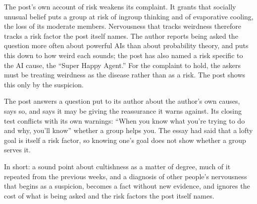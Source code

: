 \begin{afterword}
The post's own account of risk weakens its complaint. It grants that socially unusual belief puts a group at risk of ingroup thinking and of evaporative cooling, the loss of its moderate members. Nervousness that tracks weirdness therefore tracks a risk factor the post itself names. The author reports being asked the question more often about powerful AIs than about probability theory, and puts this down to how weird each sounds; the post has also named a risk specific to the AI cause, the ``Super Happy Agent.'' For the complaint to hold, the askers must be treating weirdness as the disease rather than as a risk. The post shows this only by the suspicion.

The post answers a question put to its author about the author's own causes, says so, and says it may be giving the reassurance it warns against. Its closing test conflicts with its own warnings: ``When you know what you're trying to do and why, you'll know'' whether a group helps you. The essay had said that a lofty goal is itself a risk factor, so knowing one's goal does not show whether a group serves it.

In short: a sound point about cultishness as a matter of degree, much of it repeated from the previous weeks, and a diagnosis of other people's nervousness that begins as a suspicion, becomes a fact without new evidence, and ignores the cost of what is being asked and the risk factors the post itself names.
\end{afterword}
